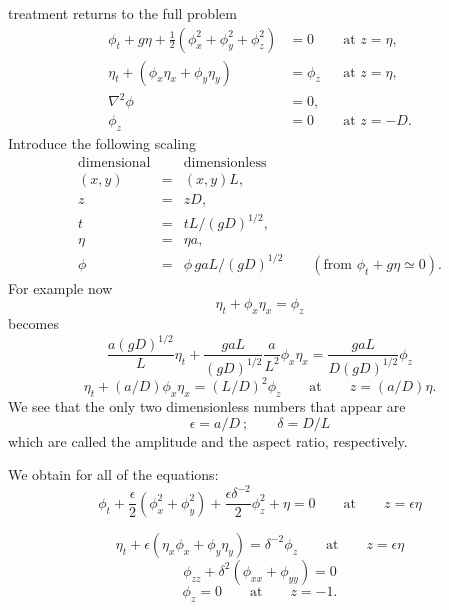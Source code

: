 treatment returns to the full problem
\begin{align*}
	\phi_t+g\eta+\frac12(\phi_x^2+\phi_y^2+\phi_z^2) & =0      &  & \text{at }z=\eta, \\
	\eta_t+(\phi_x\eta_x+\phi_y\eta_y)               & =\phi_z &  & \text{at }z=\eta, \\
	\nabla^2\phi                                     & =0,                            \\
	\phi_z                                           & =0      &  & \text{at }z=-D.
\end{align*}
Introduce the following scaling
\[
	\begin{array}{ccl}
		\text{dimensional} &   & \text{dimensionless}                                         \\[2pt]
		(x,y)              & = & (x,y)L,                                                      \\
		z                  & = & zD,                                                          \\
		t                  & = & tL/(gD)^{1/2},                                               \\
		\eta               & = & \eta a,                                                      \\
		\phi               & = & \phi\,gaL/(gD)^{1/2}\qquad(\text{from }\phi_t+g\eta\simeq0).
	\end{array}
\]
For example now
\[
	\eta_t+\phi_x\eta_x=\phi_z
\]
becomes
\[
	\frac{a(gD)^{1/2}}{L}\eta_t
	+\frac{gaL}{(gD)^{1/2}}\frac{a}{L^2}\phi_x\eta_x
	=\frac{gaL}{D(gD)^{1/2}}\phi_z
\]
\[
	\eta_t+(a/D)\phi_x\eta_x=(L/D)^2\phi_z
	\qquad\text{at}\qquad z=(a/D)\eta.
\]
We see that the only two dimensionless numbers that appear are
\[
	\epsilon=a/D\ ;\qquad \delta=D/L
\]
which are called the amplitude and the aspect ratio, respectively.

We obtain for all of the equations:
\[
	\phi_t+\frac{\epsilon}{2}(\phi_x^2+\phi_y^2)
	+\frac{\epsilon\delta^{-2}}{2}\phi_z^2+\eta=0
	\qquad\text{at}\qquad z=\epsilon\eta
\]

\sourcepagebreak

\[
	\eta_t+\epsilon(\eta_x\phi_x+\phi_y\eta_y)=\delta^{-2}\phi_z
	\qquad\text{at}\qquad z=\epsilon\eta
\]
\[
	\phi_{zz}+\delta^2(\phi_{xx}+\phi_{yy})=0
\]
\[
	\phi_z=0\qquad\text{at}\qquad z=-1.
\]

